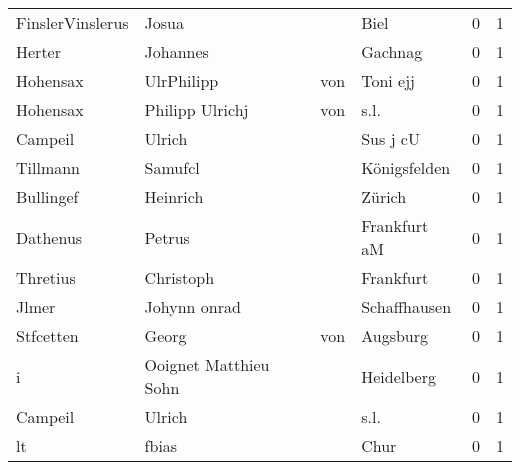 \begin{center}
\begin{tiny}
\begin{longtabu}{llllrr}
         FinslerVinslerus &                              Josua &             &                                        Biel &          0 &         1 \\
                   Herter &                           Johannes &             &                                     Gachnag &          0 &         1 \\
                 Hohensax &                         UlrPhilipp &         von &                                    Toni ejj &          0 &         1 \\
                 Hohensax &                    Philipp Ulrichj &         von &                                        s.l. &          0 &         1 \\
                  Campeil &                             Ulrich &             &                                    Sus j cU &          0 &         1 \\
                 Tillmann &                            Samufcl &             &                                Königsfelden &          0 &         1 \\
                Bullingef &                           Heinrich &             &                                      Zürich &          0 &         1 \\
                 Dathenus &                             Petrus &             &                                Frankfurt aM &          0 &         1 \\
                 Thretius &                          Christoph &             &                                   Frankfurt &          0 &         1 \\
                    Jlmer &                       Johynn onrad &             &                                Schaffhausen &          0 &         1 \\
                Stfcetten &                              Georg &         von &                                    Augsburg &          0 &         1 \\
                        i &              Ooignet Matthieu Sohn &             &                                  Heidelberg &          0 &         1 \\
                  Campeil &                             Ulrich &             &                                        s.l. &          0 &         1 \\
                       lt &                              fbias &             &                                        Chur &          0 &         1 \\

\end{longtabu}
\end{tiny}
\end{center}
